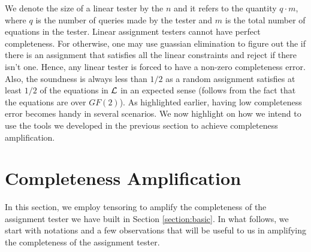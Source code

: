 


We denote the {\sf size} of a linear tester by the $n$ and it refers
to the quantity $q \cdot m$, where $q$ is the number of queries made
by the tester and $m$ is the total number of equations in the
tester. Linear assignment testers cannot have perfect completeness.
For otherwise, one may use guassian elimination to figure out the if
there is an assignment that satisfies all the linear constraints and
reject if there isn't one. Hence, any linear tester is forced to have
a non-zero completeness error. Also, the soundness is always less than
$1/2$ as a random assignment satisfies at least $1/2$ of the equations
in ${\cal L}$ in an expected sense (follows from the fact that the
equations are over ${GF}(2)$). As highlighted earlier, having low
completeness error becomes handy in several scenarios. We now
highlight on how we intend to use the tools we developed in the
previous section to achieve completeness amplification.


\section{Completeness Amplification}  \label{section:complete}

In this section, we employ tensoring to amplify the completeness of
the assignment tester we have built in Section \ref{section:basic}.
In what follows, we start with notations and a few observations that
will be useful to us in amplifying the completeness of the assignment
tester.

